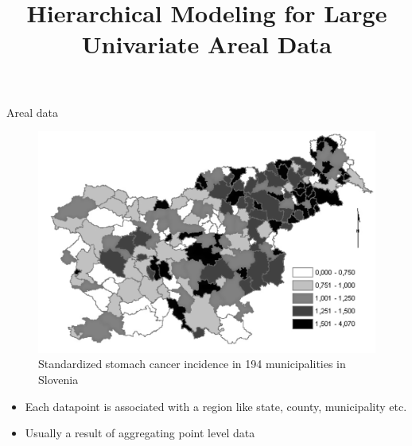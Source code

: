 



\title[]{Hierarchical Modeling for Large Univariate Areal Data}




\maketitle

\begin{frame}{Areal data}
	\begin{figure}[t!]
		\centering
		\includegraphics[scale=0.25]{../figures/sloveniaOE.png}
		\caption{Standardized stomach cancer incidence in 194 municipalities in Slovenia}
	\end{figure}
	\begin{itemize}
		\item Each datapoint is associated with a region like state, county, municipality etc.
		\item Usually a result of aggregating point level data
	\end{itemize}
\end{frame}	

